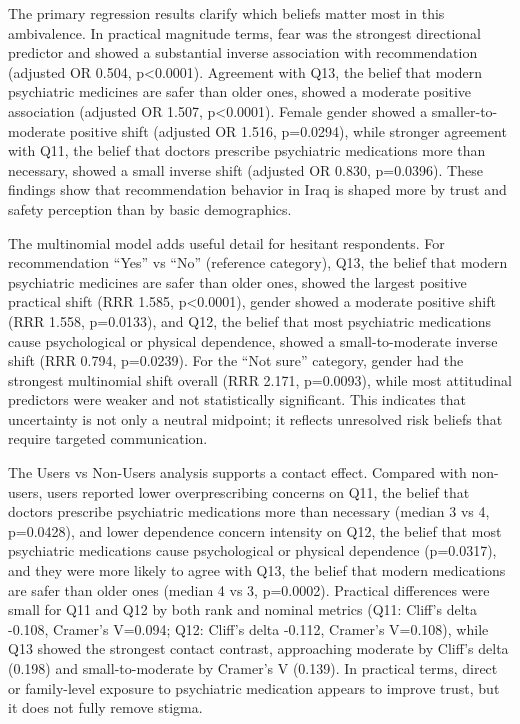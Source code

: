 The primary regression results clarify which beliefs matter most in this
ambivalence. In practical magnitude terms, fear was the strongest
directional predictor and showed a substantial inverse association with
recommendation (adjusted OR 0.504, p\textless0.0001). Agreement with
Q13, the belief that modern psychiatric medicines are safer than older
ones, showed a moderate positive association (adjusted OR 1.507,
p\textless0.0001). Female gender showed a smaller-to-moderate positive
shift (adjusted OR 1.516, p=0.0294), while stronger agreement with Q11,
the belief that doctors prescribe psychiatric medications more than
necessary, showed a small inverse shift (adjusted OR 0.830, p=0.0396).
These findings show that recommendation behavior in Iraq is shaped more
by trust and safety perception than by basic demographics.

The multinomial model adds useful detail for hesitant respondents. For
recommendation ``Yes'' vs ``No'' (reference category), Q13, the belief
that modern psychiatric medicines are safer than older ones, showed the
largest positive practical shift (RRR 1.585, p\textless0.0001), gender
showed a moderate positive shift (RRR 1.558, p=0.0133), and Q12, the
belief that most psychiatric medications cause psychological or physical
dependence, showed a small-to-moderate inverse shift (RRR 0.794,
p=0.0239). For the ``Not sure'' category, gender had the strongest
multinomial shift overall (RRR 2.171, p=0.0093), while most attitudinal
predictors were weaker and not statistically significant. This indicates
that uncertainty is not only a neutral midpoint; it reflects unresolved
risk beliefs that require targeted communication.

The Users vs Non-Users analysis supports a contact effect. Compared with
non-users, users reported lower overprescribing concerns on Q11, the
belief that doctors prescribe psychiatric medications more than
necessary (median 3 vs 4, p=0.0428), and lower dependence concern
intensity on Q12, the belief that most psychiatric medications cause
psychological or physical dependence (p=0.0317), and they were more
likely to agree with Q13, the belief that modern medications are safer
than older ones (median 4 vs 3, p=0.0002). Practical differences were
small for Q11 and Q12 by both rank and nominal metrics (Q11: Cliff's
delta -0.108, Cramer's V=0.094; Q12: Cliff's delta -0.112, Cramer's
V=0.108), while Q13 showed the strongest contact contrast, approaching
moderate by Cliff's delta (0.198) and small-to-moderate by Cramer's V
(0.139). In practical terms, direct or family-level exposure to
psychiatric medication appears to improve trust, but it does not fully
remove stigma.


